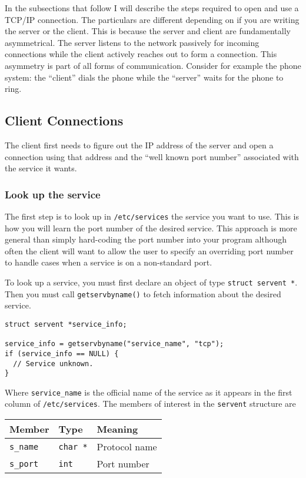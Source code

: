 \documentclass{article}
\newcommand{\filename}[1]{\texttt{#1}}
\begin{document}
In the subsections that follow I will describe the steps required to open and use a TCP/IP connection. The particulars are different depending on if you are writing the server or the client. This is because the server and client are fundamentally asymmetrical. The server listens to the network passively for incoming connections while the client actively reaches out to form a connection. This asymmetry is part of all forms of communication. Consider for example the phone system: the ``client'' dials the phone while the ``server'' waits for the phone to ring.

\subsection{Client Connections}

The client first needs to figure out the IP address of the server and open a connection using that address and the ``well known port number'' associated with the service it wants.

\subsubsection{Look up the service}

The first step is to look up in \filename{/etc/services} the service you want to use. This is how you will learn the port number of the desired service. This approach is more general than simply hard-coding the port number into your program although often the client will want to allow the user to specify an overriding port number to handle cases when a service is on a non-standard port.

To look up a service, you must first declare an object of type \texttt{struct servent *}. Then you must call \texttt{getservbyname()} to fetch information about the desired service.

\begin{verbatim}
struct servent *service_info;

service_info = getservbyname("service_name", "tcp");
if (service_info == NULL) {
  // Service unknown.
}
\end{verbatim}

Where \texttt{service\_name} is the official name of the service as it appears in the first column of \filename{/etc/services}. The members of interest in the \texttt{servent} structure are

\begin{tabular}{|l|l|l|} \hline
Member           & Type            & Meaning      \\ \hline \hline
\texttt{s\_name} & \texttt{char *} & Protocol name\\ \hline
\texttt{s\_port} & \texttt{int}    & Port number  \\ \hline
\end{tabular}
\end{document}
